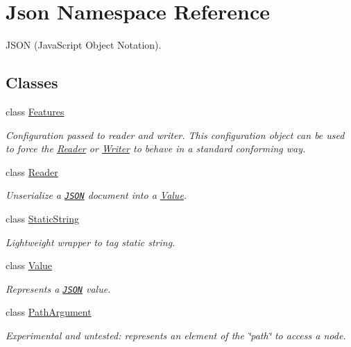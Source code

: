 \hypertarget{namespaceJson}{\section{Json Namespace Reference}
\label{d7/d03/namespaceJson}
}


J\-S\-O\-N (Java\-Script Object Notation).  


\subsection*{Classes}
\begin{DoxyCompactItemize}
\item 
class \hyperlink{classJson_1_1Features}{Features}
\begin{DoxyCompactList}\small\item\em Configuration passed to reader and writer. This configuration object can be used to force the \hyperlink{classJson_1_1Reader}{Reader} or \hyperlink{classJson_1_1Writer}{Writer} to behave in a standard conforming way. \end{DoxyCompactList}\item 
class \hyperlink{classJson_1_1Reader}{Reader}
\begin{DoxyCompactList}\small\item\em Unserialize a \href{http://www.json.org}{\tt J\-S\-O\-N} document into a \hyperlink{classJson_1_1Value}{Value}. \end{DoxyCompactList}\item 
class \hyperlink{classJson_1_1StaticString}{Static\-String}
\begin{DoxyCompactList}\small\item\em Lightweight wrapper to tag static string. \end{DoxyCompactList}\item 
class \hyperlink{classJson_1_1Value}{Value}
\begin{DoxyCompactList}\small\item\em Represents a \href{http://www.json.org}{\tt J\-S\-O\-N} value. \end{DoxyCompactList}\item 
class \hyperlink{classJson_1_1PathArgument}{Path\-Argument}
\begin{DoxyCompactList}\small\item\em Experimental and untested\-: represents an element of the \char`\"{}path\char`\"{} to access a node. \end{DoxyCompactList}\item 

\end{DoxyCompactItemize}
